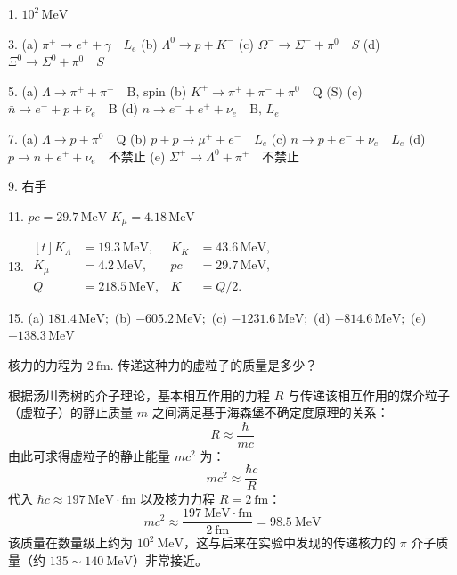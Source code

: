 \begin{oddanswers}
1. $10^2\,\mathrm{MeV}$

3. (a) $\pi^+ \to e^+ + \gamma \quad L_e$
(b) $\Lambda^0 \to p + K^-$
(c) $\Omega^- \to \Sigma^- + \pi^0 \quad S$
(d) $\Xi^0 \to \Sigma^0 + \pi^0 \quad S$

5. (a) $\Lambda \to \pi^+ + \pi^- \quad \text{B, spin}$
(b) $K^+ \to \pi^+ + \pi^- + \pi^0 \quad \text{Q (S)}$
(c) $\bar{n} \to e^- + p + \bar{\nu}_e \quad \text{B}$
(d) $n \to e^- + e^+ + \nu_e \quad \text{B, } L_e$

7. (a) $\Lambda \to p + \pi^0 \quad \text{Q}$
(b) $\bar{p} + p \to \mu^+ + e^- \quad L_e$
(c) $n \to p + e^- + \nu_e \quad L_e$
(d) $p \to n + e^+ + \nu_e \quad \text{不禁止}$
(e) $\Sigma^+ \to \Lambda^0 + \pi^+ \quad \text{不禁止}$

9. 右手

11. $pc = 29.7\,\mathrm{MeV}$
$K_\mu = 4.18\,\mathrm{MeV}$

13. \(
\begin{aligned}[t]
K_\Lambda&=19.3\,\mathrm{MeV}, & K_K&=43.6\,\mathrm{MeV},\\
K_\mu&=4.2\,\mathrm{MeV}, & pc&=29.7\,\mathrm{MeV},\\
Q&=218.5\,\mathrm{MeV}, & K&=Q/2.
\end{aligned}
\)

15. (a) $181.4\,\mathrm{MeV};$ (b) $-605.2\,\mathrm{MeV};$
(c) $-1231.6\,\mathrm{MeV};$ (d) $-814.6\,\mathrm{MeV};$
(e) $-138.3\,\mathrm{MeV}$
\end{oddanswers}

\begin{exercise}\label{ex:30.1}
核力的力程为 $2 \ \mathrm{fm}$. 传递这种力的虚粒子的质量是多少？
\end{exercise}
\begin{solution}
根据汤川秀树的介子理论，基本相互作用的力程 $R$ 与传递该相互作用的媒介粒子（虚粒子）的静止质量 $m$ 之间满足基于海森堡不确定度原理的关系：
$$ R \approx \frac{\hbar}{mc} $$
由此可求得虚粒子的静止能量 $mc^2$ 为：
$$ mc^2 \approx \frac{\hbar c}{R} $$
代入 $\hbar c \approx 197 \ \mathrm{MeV \cdot fm}$ 以及核力力程 $R = 2 \ \mathrm{fm}$：
$$ mc^2 \approx \frac{197 \ \mathrm{MeV \cdot fm}}{2 \ \mathrm{fm}} = 98.5 \ \mathrm{MeV} $$
该质量在数量级上约为 $10^2 \ \mathrm{MeV}$，这与后来在实验中发现的传递核力的 $\pi$ 介子质量（约 $135 \sim 140 \ \mathrm{MeV}$）非常接近。
\end{solution}

